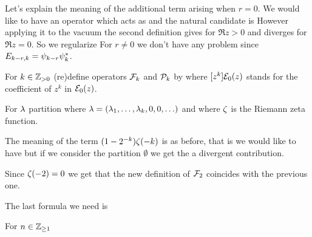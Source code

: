 \documentclass[10pt]{beamer}
\begin{document}
\begin{frame}

Let's explain the meaning of the additional term arising when $r=0$. We would like to have an operator which acts as
and the natural candidate is 
However applying it to the vacuum the second definition gives for $\Re z>0$
and diverges for $\Re z=0$. So we regularize
For $r\neq0$ we don't have any problem since $E_{k-r,k}=\psi_{k-r}\psi_k^*$.

\end{frame}

\begin{frame}

\begin{definition}
	For $k\in\mathbb Z_{>0}$ (re)define operators $\mathcal F_k$ and $\mathcal P_k$ by
	where $[z^k]\mathcal E_0(z)$ stands for the coefficient of $z^k$ in $\mathcal E_0(z)$. 
\end{definition}

\begin{lemma}
	For $\lambda$ partition
	where $\lambda=(\lambda_1,\ldots,\lambda_k,0,0,\ldots)$ and
	where $\zeta$ is the Riemann zeta function.
\end{lemma}

\end{frame}

\begin{frame}

The meaning of the term $(1-2^{-k})\zeta(-k)$ is as before, that is we would like to have
but if we consider the partition $\emptyset$ we get the a divergent contribution.

Since $\zeta(-2)=0$ we get that the new definition of $\mathcal F_2$ coincides with the previous one.

The last formula we need is 
\begin{lemma}
	For $n\in\mathbb Z_{\geq1}$
\end{lemma}

\end{frame}
\end{document}
